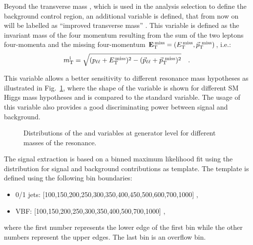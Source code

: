 Beyond the transverse mass \mt, which is used in the analysis selection to define the \dytt background control region, an additional variable is defined, that from now on will be labelled as ``improved transverse mass'' \mti. This variable is defined as the invariant mass of the four momentum resulting from the sum of the two leptons four-momenta and the missing four-momentum $\mathbf{E_\mathrm{T}^\mathrm{\,miss}} = (E_\mathrm{T}^\mathrm{\,miss}, \vec{p}_\mathrm{T}^\mathrm{~miss})$, i.e.:
\begin{equation} 
m_\mathrm{T}^\mathrm{i} = \sqrt{(p_{\ell\ell}+E_\mathrm{T}^\mathrm{\,miss})^2-(\vec{p}_{\ell\ell}+\vec{p}_\mathrm{T}^\mathrm{~miss})^2} \quad .
\end{equation}

This variable allows a better sensitivity to different resonance mass hypotheses as illustrated in Fig.~\ref{fig:mti}, where the shape of the \mti variable is shown for different SM Higgs mass hypotheses and is compared to the standard \mt variable. The usage of this variable also provides a good discriminating power between signal and background.

\begin{figure}[htb]
\centering
{}
\caption{
    Distributions of the \mt and \mti variables at generator level for different masses of the resonance.}
    \label{fig:mti}
\end{figure}

The signal extraction is based on a binned maximum likelihood fit using the \mti distribution for signal and background contributions as template. The \mti template is defined using the following bin boundaries:
\begin{itemize}
\item {0/1 jets: } [100,150,200,250,300,350,400,450,500,600,700,1000] ,
\item {VBF: } [100,150,200,250,300,350,400,500,700,1000] ,
\end{itemize}
where the first number represents the lower edge of the first bin while the other numbers represent the upper edges. The last bin is an overflow bin.

